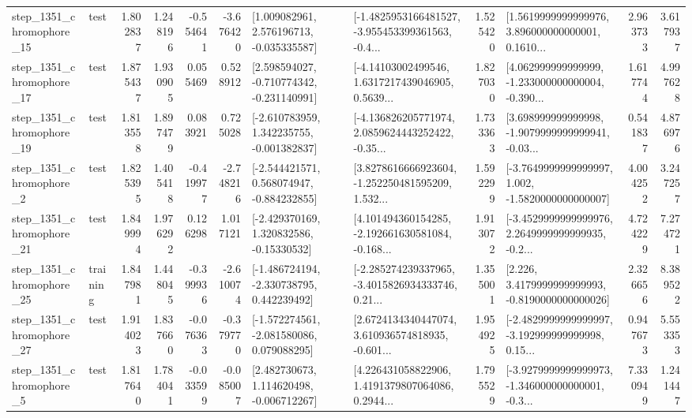 \begin{tabular}{llrrrrllrlrr}
 step\_1351\_chromophore\_15 &      test &      1.802837 &    1.248196 &     -0.554641 & -3.676420 &    [1.009082961, 2.576196713, -0.035335587] &  [-1.4825953166481527, -3.955453399361563, -0.4... &       1.525420 &  [1.5619999999999976, 3.896000000000001, 0.1610... &            2.963733 &          3.617937 \\
 step\_1351\_chromophore\_17 &      test &      1.875437 &    1.930905 &      0.055469 &  0.528912 &   [2.598594027, -0.710774342, -0.231140991] &  [-4.14103002499546, 1.6317217439046905, 0.5639... &       1.827030 &  [4.062999999999999, -1.233000000000004, -0.390... &            1.617744 &          4.997628 \\
 step\_1351\_chromophore\_19 &      test &      1.813558 &    1.897479 &      0.083921 &  0.725028 &   [-2.610783959, 1.342235755, -0.001382837] &  [-4.136826205771974, 2.0859624443252422, -0.35... &       1.733363 &  [3.698999999999998, -1.9079999999999941, -0.03... &            0.541837 &          4.876976 \\
  step\_1351\_chromophore\_2 &      test &      1.825395 &    1.405418 &     -0.419977 & -2.748216 &   [-2.544421571, 0.568074947, -0.884232855] &  [3.8278616666923604, -1.252250481595209, 1.532... &       1.592299 &  [-3.7649999999999997, 1.002, -1.5820000000000007] &            4.004252 &          3.247257 \\
 step\_1351\_chromophore\_21 &      test &      1.849994 &    1.976292 &      0.126298 &  1.017121 &    [-2.429370169, 1.320832586, -0.15330532] &  [4.101494360154285, -2.192661630581084, -0.168... &       1.913072 &  [-3.4529999999999976, 2.2649999999999935, -0.2... &            4.724229 &          7.274721 \\
 step\_1351\_chromophore\_25 &  training &      1.847981 &    1.448045 &     -0.399936 & -2.610074 &   [-1.486724194, -2.330738795, 0.442239492] &  [-2.285274239337965, -3.4015826934333746, 0.21... &       1.355001 &   [2.226, 3.4179999999999993, -0.8190000000000026] &            2.326656 &          8.389522 \\
 step\_1351\_chromophore\_27 &      test &      1.914023 &    1.837660 &     -0.076363 & -0.379770 &   [-1.572274561, -2.081580086, 0.079088295] &  [2.6724134340447074, 3.610936574818935, -0.601... &       1.954925 &  [-2.4829999999999997, -3.192999999999998, 0.15... &            0.947673 &          5.553353 \\
  step\_1351\_chromophore\_5 &      test &      1.817640 &    1.784041 &     -0.033599 & -0.085007 &    [2.482730673, 1.114620498, -0.006712267] &  [4.226431058822906, 1.4191379807064086, 0.2944... &       1.795529 &  [-3.9279999999999973, -1.346000000000001, -0.3... &            7.330949 &          1.241447 \\

\end{tabular}
